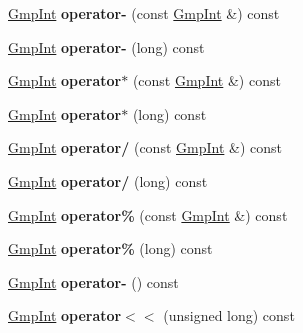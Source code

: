 \begin{DoxyCompactItemize}
\mbox{\label{class_gmp_int_ab96f7909f7eb5bf12001be9aea72657f}} 
\hyperlink{class_gmp_int}{Gmp\+Int} {\bfseries operator-\/} (const \hyperlink{class_gmp_int}{Gmp\+Int} \&) const
\item 
\mbox{\label{class_gmp_int_a6c0cf9d7dde28eb302007eae3b013e9b}} 
\hyperlink{class_gmp_int}{Gmp\+Int} {\bfseries operator-\/} (long) const
\item 
\mbox{\label{class_gmp_int_af5e0413bc9b89aaf7c4382d2aa08a672}} 
\hyperlink{class_gmp_int}{Gmp\+Int} {\bfseries operator$\ast$} (const \hyperlink{class_gmp_int}{Gmp\+Int} \&) const
\item 
\mbox{\label{class_gmp_int_ae9ddbe867e6068be31f7f16370d39a7d}} 
\hyperlink{class_gmp_int}{Gmp\+Int} {\bfseries operator$\ast$} (long) const
\item 
\mbox{\label{class_gmp_int_aecf1f61a5d8388bb8e78bc525f20102d}} 
\hyperlink{class_gmp_int}{Gmp\+Int} {\bfseries operator/} (const \hyperlink{class_gmp_int}{Gmp\+Int} \&) const
\item 
\mbox{\label{class_gmp_int_af6cb383f28675a9321a369f129c7461b}} 
\hyperlink{class_gmp_int}{Gmp\+Int} {\bfseries operator/} (long) const
\item 
\mbox{\label{class_gmp_int_a4b4828bf7da7958f0e7349703138d960}} 
\hyperlink{class_gmp_int}{Gmp\+Int} {\bfseries operator\%} (const \hyperlink{class_gmp_int}{Gmp\+Int} \&) const
\item 
\mbox{\label{class_gmp_int_a00c646809546ce6b15cb1f15b72fbf24}} 
\hyperlink{class_gmp_int}{Gmp\+Int} {\bfseries operator\%} (long) const
\item 
\mbox{\label{class_gmp_int_ac398fe271404fd8cd52da62dcf15c7d9}} 
\hyperlink{class_gmp_int}{Gmp\+Int} {\bfseries operator-\/} () const
\item 
\mbox{\label{class_gmp_int_af349b7a15ac16a17ab341f6061a910cc}} 
\hyperlink{class_gmp_int}{Gmp\+Int} {\bfseries operator$<$$<$} (unsigned long) const
\item 

\end{DoxyCompactItemize}
